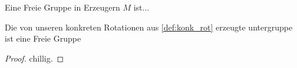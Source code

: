 \begin{definition}\label{def:freie_grp}
Eine Freie Gruppe in Erzeugern $M$ ist...
\end{definition}

\begin{theorem}\label{thm:freie_grp_an_rot}
Die von unseren konkreten Rotationen aus \ref{def:konk_rot} erzeugte untergruppe ist eine Freie Gruppe
\end{theorem}
\begin{proof}
chillig.
\end{proof}


